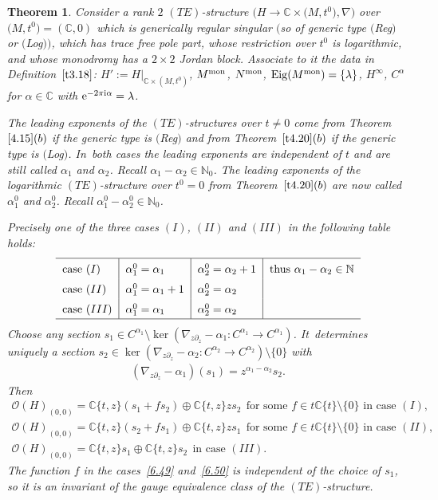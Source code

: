 \documentclass[10pt,a4paper]{amsart}
\numberwithin{equation}{section}
\numberwithin{figure}{section}
\newcommand{\N}{{\mathbb N}}
\newcommand{\C}{{\mathbb C}}
\newcommand{\OO}{{\mathcal O}}
\newcommand{\paa}{\partial}
\newcommand{\nnn}{\nabla}
\DeclareMathOperator{\Eig}{Eig}
\newtheorem{Theorem}{Theorem}[section]
\begin{document}
\begin{Theorem}\label{t6.7}
Consider a rank $2$ $(TE)$-structure $\big(H\to\C\times \big(M,t^0\big),\nnn\big)$
over $\big(M,t^0\big)=(\C,0)$ which is generically regular singular
$($so of generic type $($Reg$)$ or $($Log$))$, which has trace free
pole part, whose restriction over $t^0$ is logarithmic,
and whose monodromy has a $2\times 2$ Jordan block.
Associate to it the data in Definition~$\ref{t3.18}$:
$H':=H|_{\C\times (M,t^0)}$, $M^{\rm mon}$, $N^{\rm mon}$,
$\Eig(M^{\rm mon})=\{\lambda\}$, $H^\infty$,
$C^\alpha$ for $\alpha\in\C$ with ${\rm e}^{-2\pi {\rm i}\alpha}=\lambda$.

The leading exponents of the $(TE)$-structures over $t\neq 0$
come from Theorem~$\ref{4.15}(b)$ if the generic type is
$($Reg$)$ and from Theorem~$\ref{t4.20}(b)$ if the generic type
is $($Log$)$. In~both cases the leading exponents are independent
of $t$ and are still called $\alpha_1$ and $\alpha_2$.
Recall $\alpha_1-\alpha_2\in\N_0$.
The leading exponents of the logarithmic $(TE)$-structure
over $t^0=0$ from Theorem~$\ref{t4.20}(b)$ are now called
$\alpha_1^0$ and $\alpha_2^0$.
Recall $\alpha_1^0-\alpha_2^0\in\N_0$.

Precisely one of the three cases $(I)$, $(II)$ and $(III)$
in the following table holds:
\[
\def\arraystretch{1.5}
\begin{tabular}{l|l|l|l}
\hline
case $(I)$ & $\alpha_1^0=\alpha_1$ &$ \alpha_2^0=\alpha_2+1$ &thus $\alpha_1-\alpha_2\in\N$
\\
case $(II)$ & $\alpha_1^0=\alpha_1+1$ & $\alpha_2^0=\alpha_2$
\\
case $(III)$ & $\alpha_1^0=\alpha_1$ & $\alpha_2^0=\alpha_2$
\\
\hline
\end{tabular}
\]
Choose any section
$s_1\in C^{\alpha_1}\setminus \ker(\nnn_{z\paa_z}-\alpha_1\colon
C^{\alpha_1}\to C^{\alpha_1})$. It~determines uniquely
a section
$s_2\in \ker(\nnn_{z\paa_z}-\alpha_2\colon C^{\alpha_2}\to
C^{\alpha_2})\setminus\{0\}$
with
\begin{gather}\label{6.48}
(\nnn_{z\paa_z}-\alpha_1)(s_1)=z^{\alpha_1-\alpha_2}s_2.
\end{gather}
Then
\begin{gather}
\OO(H)_{(0,0)}=\C\{t,z\}(s_1+fs_2)\oplus \C\{t,z\}zs_2\ \
\text{for some } f\in t\C\{t\}\setminus\{0\}
\text{ in case $(I)$,}\label{6.49}
\\
\OO(H)_{(0,0)}= \C\{t,z\}(s_2+fs_1)\oplus \C\{t,z\}zs_1\ \
\text{for some }f\in t\C\{t\}\setminus\{0\}
\text{ in case $(II)$,}\!\!\label{6.50}
\\
\OO(H)_{(0,0)}=\C\{t,z\}s_1 \oplus \C\{t,z\}s_2\ \
\text{in case $(III)$.}\label{6.51}
\end{gather}
The function $f$ in the cases~\eqref{6.49} and~\eqref{6.50}
is independent of the choice of $s_1$, so it is an
invariant of the gauge equivalence class of the
$(TE)$-structure.
\end{Theorem}
\end{document}
